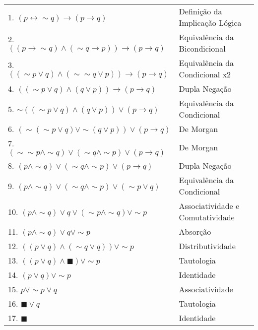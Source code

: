 \documentclass[12pt, a4paper,final]{article}
\begin{document}
\begin{enumerate}
\begin{enumerate}[label=(\alph*)]
                \begin{tabular}{ll}
                    1. $(p \leftrightarrow  \sim q) \rightarrow (p \rightarrow q)$ & Definição da Implicação Lógica \\
                    2. $((p \rightarrow \sim q) \wedge (\sim q \rightarrow p)) \rightarrow (p \rightarrow q)$ & Equivalência da Bicondicional \\
                    3. $((\sim p \vee q) \wedge (\sim \sim q \vee p)) \rightarrow (p \rightarrow q)$ & Equivalência da Condicional x2 \\
                    4. $((\sim p \vee q) \wedge (q \vee p)) \rightarrow (p \rightarrow q)$ & Dupla Negação \\
                    5. $\sim((\sim p \vee q) \wedge (q \vee p)) \vee (p \rightarrow q)$ & Equivalência da Condicional \\
                    6. $(\sim(\sim p \vee q) \vee \sim (q \vee p)) \vee (p \rightarrow q)$ & De Morgan \\
                    7. $(\sim \sim p \wedge \sim q) \vee (\sim q \wedge \sim p) \vee (p \rightarrow q)$ & De Morgan \\
                    8. $(p \wedge \sim q) \vee (\sim q \wedge \sim p) \vee (p \rightarrow q)$ & Dupla Negação \\
                    9. $(p \wedge \sim q) \vee (\sim q \wedge \sim p) \vee (\sim p \vee q)$ & Equivalência da Condicional \\
                    10. $(p \wedge \sim q) \vee q \vee (\sim p \wedge \sim q) \vee \sim p$ & Associatividade e Comutatividade \\
                    11. $(p \wedge \sim q) \vee q \vee \sim p$ & Absorção \\
                    12. $((p \vee q) \wedge (\sim q \vee q)) \vee \sim p$ & Distributividade \\
                    13. $((p \vee q) \wedge \blacksquare ) \vee \sim p$ & Tautologia \\
                    14. $(p \vee q) \vee \sim p$ & Identidade \\
                    15. $p \vee \sim p \vee q$ & Associatividade \\
                    16. $\blacksquare \vee q$ & Tautologia \\
                    17. $\blacksquare$ & Identidade \\   
                \end{tabular}
            

\end{enumerate}
\end{enumerate}
\end{document}
